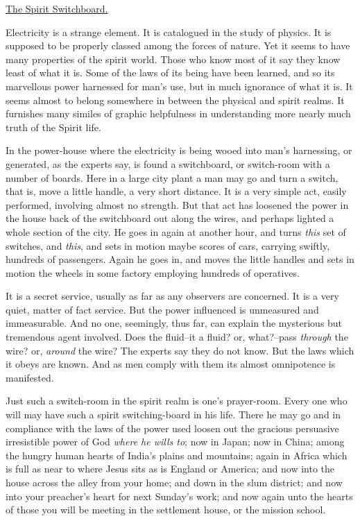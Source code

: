 \underline{The Spirit Switchboard.}


Electricity is a strange element. It is catalogued in the study of
physics. It is supposed to be properly classed among the forces of nature.
Yet it seems to have many properties of the spirit world. Those who know
most of it say they know least of what it is. Some of the laws of its
being have been learned, and so its marvellous power harnessed for man's
use, but in much ignorance of what it is. It seems almost to belong
somewhere in between the physical and spirit realms. It furnishes many
similes of graphic helpfulness in understanding more nearly much truth of
the Spirit life.

In the power-house where the electricity is being wooed into man's
harnessing, or generated, as the experts say, is found a switchboard, or
switch-room with a number of boards. Here in a large city plant a man may
go and turn a switch, that is, move a little handle, a very short
distance. It is a very simple act, easily performed, involving almost no
strength. But that act has loosened the power in the house back of the
switchboard out along the wires, and perhaps lighted a whole section of
the city. He goes in again at another hour, and turns \textit{this} set of
switches, and \textit{this}, and sets in motion maybe scores of cars, carrying
swiftly, hundreds of passengers. Again he goes in, and moves the little
handles and sets in motion the wheels in some factory employing hundreds
of operatives.

It is a secret service, usually as far as any observers are concerned. It
is a very quiet, matter of fact service. But the power influenced is
unmeasured and immeasurable. And no one, seemingly, thus far, can explain
the mysterious but tremendous agent involved. Does the fluid--it a fluid?
or, what?--pass \textit{through} the wire? or, \textit{around} the wire? The experts say
they do not know. But the laws which it obeys are known. And as men comply
with them its almost omnipotence is manifested.

Just such a switch-room in the spirit realm is one's prayer-room. Every
one who will may have such a spirit switching-board in his life. There he
may go and in compliance with the laws of the power used loosen out the
gracious persuasive irresistible power of God \textit{where he wills to}; now in
Japan; now in China; among the hungry human hearts of India's plains and
mountains; again in Africa which is full as near to where Jesus sits as is
England or America; and now into the house across the alley from your
home; and down in the slum district; and now into your preacher's heart
for next Sunday's work; and now again unto the hearts of those you will be
meeting in the settlement house, or the mission school.

